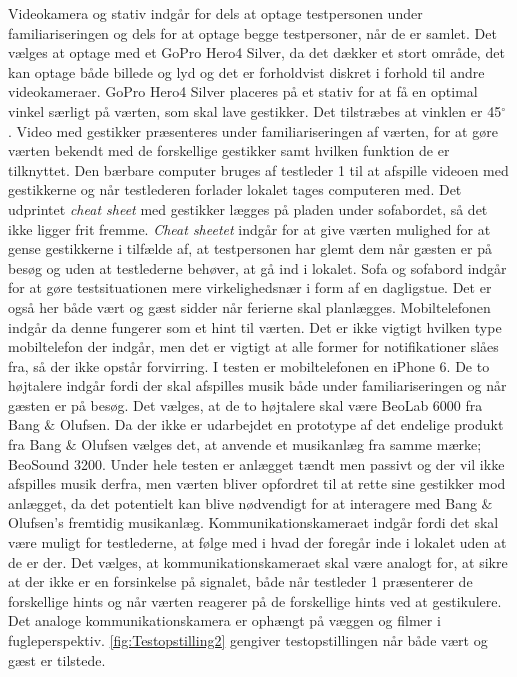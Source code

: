 Videokamera og stativ indgår for dels at optage testpersonen under familiariseringen og dels for at optage begge testpersoner, når de er samlet. Det vælges at optage med et GoPro Hero4 Silver, da det dækker et stort område, det kan optage både billede og lyd og det er forholdvist diskret i forhold til andre videokameraer. GoPro Hero4 Silver placeres på et stativ for at få en optimal vinkel særligt på værten, som skal lave gestikker. Det tilstræbes at vinklen er 45$^{\circ}$ . Video med gestikker præsenteres under familiariseringen af værten, for at gøre værten bekendt med de forskellige gestikker samt hvilken funktion de er tilknyttet. Den bærbare computer bruges af testleder 1 til at afspille videoen med gestikkerne og når testlederen forlader lokalet tages computeren med. Det udprintet \textit{cheat sheet} med gestikker lægges på pladen under sofabordet, så det ikke ligger frit fremme. \textit{Cheat sheetet} indgår for at give værten mulighed for at gense gestikkerne i tilfælde af, at testpersonen har glemt dem når gæsten er på besøg og uden at testlederne behøver, at gå ind i lokalet. Sofa og sofabord indgår for at gøre testsituationen mere virkelighedsnær i form af en dagligstue. Det er også her både vært og gæst sidder når ferierne skal planlægges. Mobiltelefonen indgår da denne fungerer som et hint til værten. Det er ikke vigtigt hvilken type mobiltelefon der indgår, men det er vigtigt at alle former for notifikationer slåes fra, så der ikke opstår forvirring. I testen er mobiltelefonen en iPhone 6. De to højtalere indgår fordi der skal afspilles musik både under familiariseringen og når gæsten er på besøg. Det vælges, at de to højtalere skal være BeoLab 6000 fra Bang $\&$ Olufsen. Da der ikke er udarbejdet en prototype af det endelige produkt fra Bang $\&$ Olufsen vælges det, at anvende et musikanlæg fra samme mærke; BeoSound 3200. Under hele testen er anlægget tændt men passivt og der vil ikke afspilles musik derfra, men værten bliver opfordret til at rette sine gestikker mod anlægget, da det potentielt kan blive nødvendigt for at interagere med Bang $\&$ Olufsen's fremtidig musikanlæg. Kommunikationskameraet indgår fordi det skal være muligt for testlederne, at følge med i hvad der foregår inde i lokalet uden at de er der. Det vælges, at kommunikationskameraet skal være analogt for, at sikre at der ikke er en forsinkelse på signalet, både når testleder 1 præsenterer de forskellige hints og når værten reagerer på de forskellige hints ved at gestikulere. Det analoge kommunikationskamera er ophængt på væggen og filmer i fugleperspektiv. \autoref{fig:Testopstilling2} gengiver testopstillingen når både vært og gæst er tilstede. 
